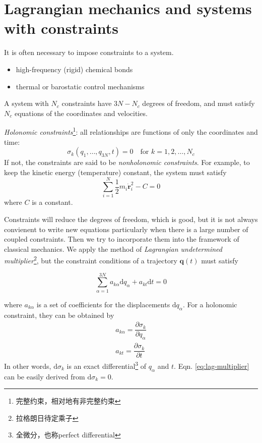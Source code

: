 \documentclass[
  10pt,
  twoside,
  openany,
  b5paper, %
  colorscheme = bootstrap-v4, %
]{qyxf-book}
\numberwithin{equation}{section}
\newcommand{\md}{\mathrm{d}}
\newcommand{\p}[2]{\dfrac{\partial #1}{\partial #2}}
\newcommand{\vr}{\boldsymbol{r}}
\newcommand{\vq}{\boldsymbol{q}}
\newcommand{\dvr}{\dot{\vr}}
\newcommand{\half}{\dfrac{1}{2}}
\newcommand{\sumin}{\sum_{i=1}^N}
\newcommand{\suman}{\sum_{\alpha=1}^{3N}}
\begin{document}
\section{Lagrangian mechanics and systems with constraints}
It is often necessary to impose constraints to a system.

\example \begin{itemize}
	\item high-frequency (rigid) chemical bonds
	\item thermal or barostatic control mechanisms
\end{itemize}

A system with $N_c$ constraints have $3N-N_c$ degrees of freedom, and must satisfy $N_c$ equations of the coordinates and velocities.

\textit{Holonomic constraints}\footnote{完整约束，相对地有非完整约束}: all relationships are functions of only the coordinates and time:
\begin{equation}
	\sigma_k(q_1,\dots,q_{3N},t)=0\quad \text{for } k=1,2,\dots,N_c
\end{equation}
If not, the constraints are said to be \textit{nonholonomic constraints}. 
For example, to keep the kinetic energy (temperature) constant, the system must satisfy
\begin{equation}
	\sumin\half m_i\dvr_i^2-C=0 \label{eq:kinetic-constrain}
\end{equation}
where $C$ is a constant.

Constraints will reduce the degrees of freedom, which is good, but it is not always convienent to write new equations particularly when there is a large number of coupled constraints. 
Then we try to incorporate them into the framework of classical mechanics.
We apply the method of \textit{Lagrangian undetermined multiplier}\footnote{拉格朗日待定乘子}, but the constraint conditions of a trajectory $\vq(t)$ must satisfy
\begin{tcolorbox}
	\begin{equation}
		\suman a_{k\alpha}\md q_\alpha+a_{kt}\md t=0 \label{eq:lag-multiplier}
	\end{equation}
\end{tcolorbox}
where $a_{k\alpha}$ is a set of coefficients for the displacements $\md q_\alpha$. For a holonomic constraint, they can be obtained by
\begin{gather}
	a_{k\alpha}=\p{\sigma_k}{q_\alpha}\\
	a_{kt}=\p{\sigma_k}{t}
\end{gather}
In other words, $\md\sigma_k$ is an exact differential\footnote{全微分，也称perfect differential} of $q_\alpha$ and $t$. Eqn. \ref{eq:lag-multiplier} can be easily derived from $\md\sigma_k=0$.
\end{document}
